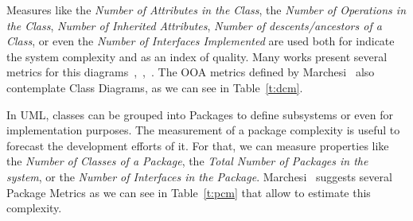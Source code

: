 Measures like the \emph{Number of Attributes in the Class}, the \emph{Number of Operations in the Class}, \emph{Number of Inherited Attributes}, \emph{Number of descents/ancestors of a Class}, or even the \emph{Number of Interfaces Implemented} are used both for indicate the system complexity and as an index of quality.
Many works present several metrics for this diagrams~\cite{DBLP:journals/Lobjet/GeneroPC00},~\cite{Eichelberger_onclass},~\cite{Yi04acomparison}.
The OOA metrics defined by Marchesi~\cite{Marchesi:1998:OMU:522081.795010} also contemplate Class Diagrams, as we can see in Table~\ref{t:dcm}.


In UML, classes can be grouped into Packages to define subsystems or even for implementation purposes.
The measurement of a package complexity is useful to forecast the development efforts of it.
For that, we can measure properties like the \emph{Number of Classes of a Package}, the \emph{Total Number of Packages in the system}, or the \emph{Number of Interfaces in the Package}.
Marchesi~\cite{Marchesi:1998:OMU:522081.795010} suggests several Package Metrics as we can see in Table~\ref{t:pcm} that allow to estimate this complexity.

